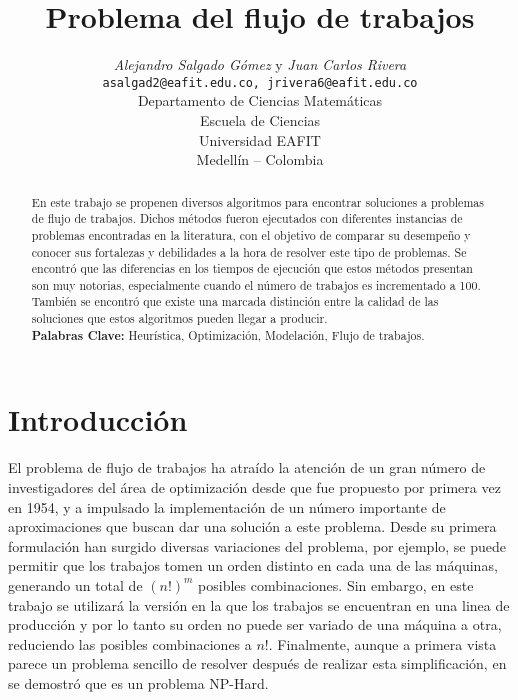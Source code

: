 \documentclass[10pt, twoside]{article}
\title{Problema del flujo de trabajos}
\author{\emph{Alejandro Salgado Gómez} y \emph{Juan Carlos Rivera}\\
\vspace{0.3cm}
\small{\tt{asalgad2@eafit.edu.co, jrivera6@eafit.edu.co}}\\
Departamento de Ciencias Matemáticas\\
Escuela de Ciencias\\
Universidad EAFIT\\
Medellín -- Colombia}
\date{}
\begin{document}
    \maketitle

    \thispagestyle{firststyle}

\begin{abstract}
En este trabajo se propenen diversos algoritmos para encontrar
soluciones a problemas de flujo de trabajos. Dichos métodos fueron ejecutados
con diferentes instancias de problemas encontradas en la literatura, con el
objetivo de comparar su desempeño y conocer sus fortalezas y debilidades a
la hora de resolver este tipo de problemas. Se encontró que las diferencias en
los tiempos de ejecución que estos métodos presentan son muy notorias,
especialmente cuando el número de trabajos es incrementado a 100. También
se encontró que existe una marcada distinción entre la calidad de las
soluciones que estos algoritmos pueden llegar a producir.\\

\noindent \textbf{Palabras Clave:}
Heurística, Optimización, Modelación, Flujo de trabajos.
\end{abstract}

\section{Introducción}

El problema de flujo de trabajos ha atraído la atención de un gran número de
investigadores del área de optimización desde que fue propuesto por primera vez
en 1954, y a impulsado la implementación de un número importante de
aproximaciones que buscan dar una solución a este problema. Desde su primera
formulación han surgido diversas variaciones del problema, por ejemplo, se puede
permitir que los trabajos tomen un orden distinto en cada una de las máquinas,
generando un total de $(n!)^m$ posibles combinaciones. Sin embargo, en este
trabajo se utilizará la versión en la que los trabajos se encuentran en una linea
de producción y por lo tanto su orden no puede ser variado de una máquina a otra,
reduciendo las posibles combinaciones a $n!$. Finalmente, aunque a primera
vista parece un problema sencillo de resolver después de realizar esta
simplificación, en \cite{complex} se demostró que es un problema
NP-Hard.\\
\end{document}
